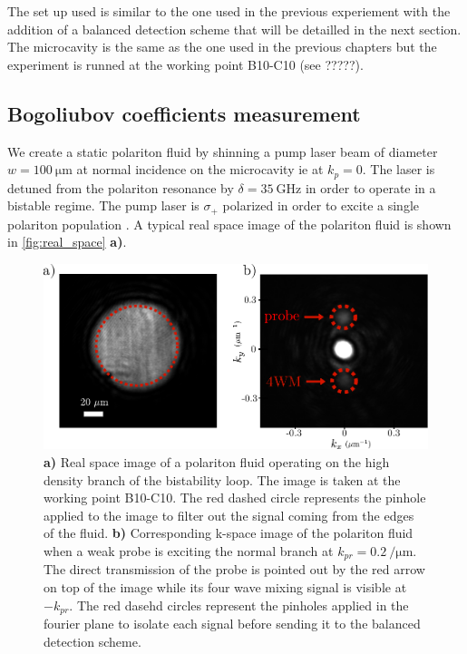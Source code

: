 The set up used is similar to the one used in the previous experiement with the addition of a balanced detection scheme that will be detailled in the next section. 
The microcavity is the same as the one used in the previous chapters but the experiment is runned at the working point B10-C10 (see ?????).

\bigskip

\subsection{Bogoliubov coefficients measurement}


We create a static polariton fluid by shinning a pump laser beam of diameter $w=\SI{100}{\micro\meter}$ at normal incidence on the microcavity ie at $k_p=0$. The laser is detuned from the polariton resonance by
$\delta = \SI{35}{\giga\hertz}$ in order to operate in a bistable regime. The pump laser is $\sigma_+$ polarized in order to excite a single polariton population \cite{timofeev_exciton_2012}. A typical real space image of the polariton fluid is shown in \autoref{fig:real_space} \textbf{a)}. 


\begin{figure}
    \centering
    \includegraphics[width=1\textwidth]{chap_correlation/fig/r_and_k_space.pdf}
    \caption{\textbf{a)} Real space image of a polariton fluid operating on the high density branch of the bistability loop. The image is taken at the working point B10-C10. The red dashed circle represents
    the pinhole applied to the image to filter out the signal coming from the edges of the fluid. \textbf{b)} Corresponding k-space image of the polariton fluid when a weak probe is exciting the normal branch at $k_{pr}=\SI{0.2}{\per\micro\meter}$. 
    The direct transmission of the probe is pointed out by the red arrow on top of the image while its four wave mixing signal is visible at $-k_{pr}$. The red dasehd circles represent the pinholes applied 
    in the fourier plane to isolate each signal before sending it to the balanced detection scheme. }
    \label{fig:real_space}
\end{figure}


